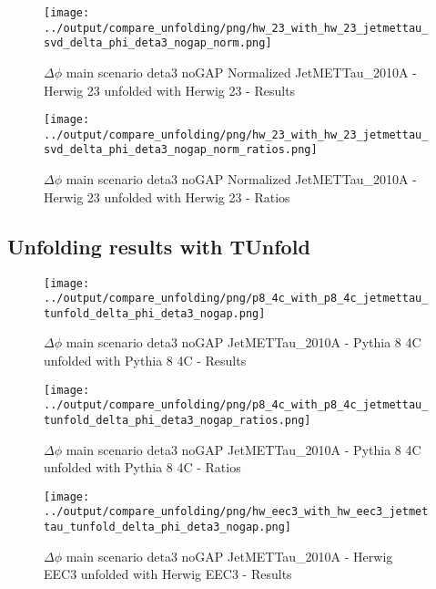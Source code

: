 \documentclass[11pt]{book}
\begin{document}
\begin{figure}[ht]
\centering
\texttt{[image: ../output/compare\_unfolding/png/hw\_23\_with\_hw\_23\_jetmettau\_svd\_delta\_phi\_deta3\_nogap\_norm.png]}
\caption{$\Delta\phi$ main scenario deta3 noGAP Normalized JetMETTau\_2010A - Herwig 23 unfolded with Herwig 23 - Results}
\label{hw_23_hw_23_jetmettau_svd_delta_phi_deta3_nogap_norm_a}
\end{figure}

\begin{figure}[ht]
\centering
\texttt{[image: ../output/compare\_unfolding/png/hw\_23\_with\_hw\_23\_jetmettau\_svd\_delta\_phi\_deta3\_nogap\_norm\_ratios.png]}
\caption{$\Delta\phi$ main scenario deta3 noGAP Normalized JetMETTau\_2010A - Herwig 23 unfolded with Herwig 23 - Ratios}
\label{hw_23_hw_23_jetmettau_svd_delta_phi_deta3_nogap_norm_b}
\end{figure}



\clearpage
\subsection{Unfolding results with TUnfold}

\begin{figure}[ht]
\centering
\texttt{[image: ../output/compare\_unfolding/png/p8\_4c\_with\_p8\_4c\_jetmettau\_tunfold\_delta\_phi\_deta3\_nogap.png]}
\caption{$\Delta\phi$ main scenario deta3 noGAP JetMETTau\_2010A - Pythia 8 4C unfolded with Pythia 8 4C - Results}
\label{p8_p8_jetmettau_tunfold_delta_phi_deta3_nogap_a}
\end{figure}

\begin{figure}[ht]
\centering
\texttt{[image: ../output/compare\_unfolding/png/p8\_4c\_with\_p8\_4c\_jetmettau\_tunfold\_delta\_phi\_deta3\_nogap\_ratios.png]}
\caption{$\Delta\phi$ main scenario deta3 noGAP JetMETTau\_2010A - Pythia 8 4C unfolded with Pythia 8 4C - Ratios}
\label{p8_p8_jetmettau_tunfold_delta_phi_deta3_nogap_b}
\end{figure}

\begin{figure}[ht]
\centering
\texttt{[image: ../output/compare\_unfolding/png/hw\_eec3\_with\_hw\_eec3\_jetmettau\_tunfold\_delta\_phi\_deta3\_nogap.png]}
\caption{$\Delta\phi$ main scenario deta3 noGAP JetMETTau\_2010A - Herwig EEC3 unfolded with Herwig EEC3 - Results}
\label{hw_eec3_hw_eec3_jetmettau_tunfold_delta_phi_deta3_nogap_a}
\end{figure}
\end{document}
